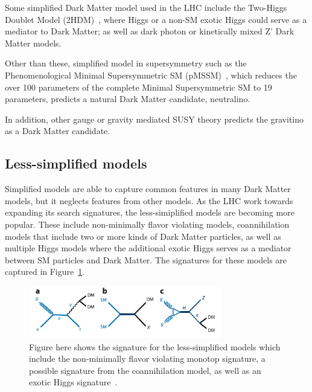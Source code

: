 Some simplified Dark Matter model used in the LHC include the Two-Higgs Doublet Model (2HDM)~\cite{TwoHiggs2012}, where Higgs or a non-SM exotic Higgs could serve as a mediator to Dark Matter; as well as dark photon or kinetically mixed Z' Dark Matter models. 

Other than these, simplified model in supersymmetry such as the Phenomenological Minimal Supersymmetric SM (pMSSM)~\cite{pMSSM1996}, which reduces the over 100 parameters of the complete Minimal Supersymmetric SM to 19 parameters, predicts a natural Dark Matter candidate, neutralino. 

In addition, other gauge or gravity mediated SUSY theory predicts the gravitino as a Dark Matter candidate. 

\subsection{Less-simplified models}
Simplified models are able to capture common features in many Dark Matter models, but it neglects features from other models. As the LHC work towards expanding its search signatures, the less-simiplified models are becoming more popular. These include non-minimally flavor violating models, coannihilation models that include two or more kinds of Dark Matter particles, as well as multiple Higgs models where the additional exotic Higgs serves as a mediator between SM particles and Dark Matter. The
signatures for these models are captured in Figure~\ref{fig:Less-Simplified}.

\begin{figure}[!htb]
    \begin{center}
        \includegraphics[width=0.75\textwidth]{figures/chapter_DM/Less-Simplified}
        \caption{
            Figure here shows the signature for the less-simplified models which include the non-minimally flavor violating monotop signature, a possible signature from the coannihilation model, as well as an exotic Higgs signature~\cite{DMSearchatCollider2018}.
        }
        \label{fig:Less-Simplified}
    \end{center}
\end{figure}

